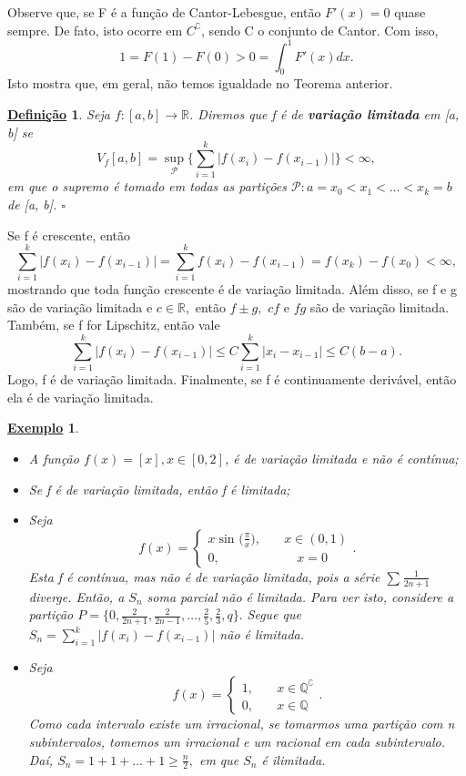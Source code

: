 \documentclass{article}
\newtheorem*{def*}{\underline{Defini\c c\~ao}}
\newtheorem{example}{\underline{Exemplo}}
\begin{document}
  Observe que, se F é a função de Cantor-Lebesgue, então \(F'(x) = 0\) quase sempre. De fato, isto ocorre em \(C ^{\complement}\), sendo C o conjunto de Cantor. Com isso, 
    \[
      1 = F(1) - F(0) > 0 = \int_{0}^{1}F'(x)dx.
    \]
  Isto mostra que, em geral, não temos igualdade no Teorema anterior.
 \begin{def*}
   Seja \(f:[a, b]\rightarrow \mathbb{R}\). Diremos que f é de \textbf{variação limitada} em [a, b] se 
     \[
       V_f[a, b] = \sup_{\mathcal{P}}\biggl\{\sum\limits_{i=1}^{k}|f(x_{i}) - f(x_{i-1})|\biggr\} < \infty,
     \]
  em que o supremo é tomado em todas as partições \(\mathcal{P}: a = x_{0} < x_1 < \dotsc <x_{k} = b\) de [a, b]. \(\square\)
 \end{def*}
 Se f é crescente, então 
   \[
     \sum\limits_{i=1}^{k} |f(x_{i}) - f(x_{i-1})| = \sum\limits_{i=1}^{k}f(x_{i}) - f(x_{i-1}) = f(x_{k}) - f(x_{0}) < \infty,
   \]
  mostrando que toda função crescente é de variação limitada. Além disso, se f e g são de variação limitada e \(c\in \mathbb{R},\) então \(f\pm g,\) \(cf\) e \(fg\) são de variação limitada. Também, se f for Lipschitz, então vale 
    \[
      \sum\limits_{i=1}^{k}|f(x_{i}) - f(x_{i-1})| \leq C \sum\limits_{i=1}^{k}|x_{i}-x_{i-1}| \leq C(b-a).
    \]
  Logo, f é de variação limitada. Finalmente, se f é continuamente derivável, então ela é de variação limitada.
 \begin{example}
  \begin{itemize}
    \item[i)] A função \(f(x) = [x], x\in [0, 2]\), é de variação limitada e não é contínua;
    \item[ii)] Se f é de variação limitada, então f é limitada;
    \item[iii)] Seja 
        \[
          f(x) = \left\{\begin{array}{ll}
              x\sin^{}{\biggl(\frac{\pi }{x}\biggr)},\quad &x\in (0 ,1)\\ 
              0,&\quad x = 0
            \end{array}\right..
        \]
    Esta f é contínua, mas não é de variação limitada, pois a série \(\sum\limits_{}^{}\frac{1}{2n+1}\) diverge. Então, a \(S_{n}\) soma parcial não é limitada. Para ver isto, considere a partição \(P = \biggl\{0, \frac{2}{2n+1}, \frac{2}{2n-1}, \dotsc , \frac{2}{5}, \frac{2}{3}, q\biggr\}.\) Segue que \(S_{n} = \sum\limits_{i=1}^{k}|f(x_{i}) - f(x_{i-1})|\) não 
  é limitada.
  \item[iv)] Seja 
    \[
      f(x) = \left\{\begin{array}{ll}
          1,&\quad x\in \mathbb{Q}^{\complement}\\
          0,&\quad x\in \mathbb{Q}
        \end{array}\right..
    \]
    Como cada intervalo existe um irracional, se tomarmos uma partição com n subintervalos, tomemos um irracional e um racional em cada subintervalo. Daí, \(S_{n} = 1 + 1 +\dotsc +1\geq \frac{n}{2},\) em que \(S_{n}\) é ilimitada.
  \end{itemize}
 \end{example}
\end{document}
